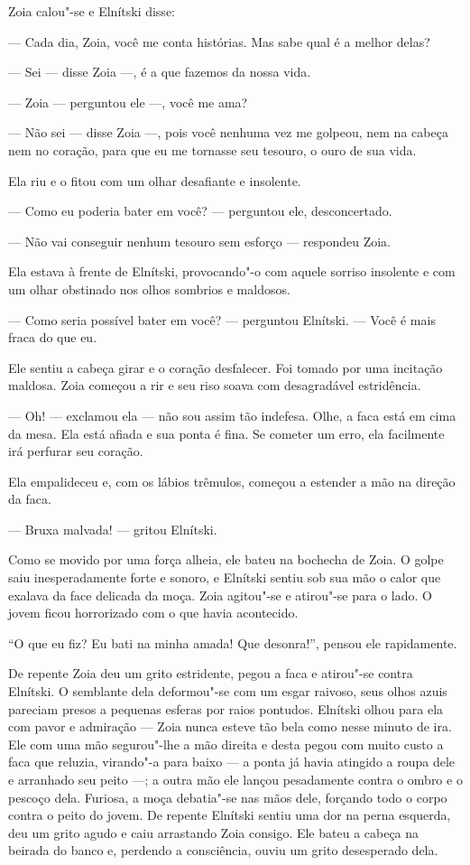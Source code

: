 Zoia calou"-se e Elnítski disse:

--- Cada dia, Zoia, você me conta histórias. Mas sabe qual é a melhor
delas?

--- Sei --- disse Zoia ---, é a que fazemos da nossa vida.

--- Zoia --- perguntou ele ---, você me ama?

--- Não sei --- disse Zoia ---, pois você nenhuma vez me golpeou, nem na
cabeça nem no coração, para que eu me tornasse seu tesouro, o ouro de
sua vida.

Ela riu e o fitou com um olhar desafiante e insolente.

--- Como eu poderia bater em você? --- perguntou ele, desconcertado.

--- Não vai conseguir nenhum tesouro sem esforço --- respondeu Zoia.

Ela estava à frente de Elnítski, provocando"-o com aquele sorriso
insolente e com um olhar obstinado nos olhos sombrios e maldosos.

--- Como seria possível bater em você? --- perguntou Elnítski. --- Você
é mais fraca do que eu.

Ele sentiu a cabeça girar e o coração desfalecer. Foi tomado por uma
incitação maldosa. Zoia começou a rir e seu riso soava com desagradável
estridência.

--- Oh! --- exclamou ela --- não sou assim tão indefesa. Olhe, a faca
está em cima da mesa. Ela está afiada e sua ponta é fina. Se cometer um
erro, ela facilmente irá perfurar seu coração.

Ela empalideceu e, com os lábios trêmulos, começou a estender a mão na
direção da faca.

--- Bruxa malvada! --- gritou Elnítski.

Como se movido por uma força alheia, ele bateu na bochecha de Zoia. O
golpe saiu inesperadamente forte e sonoro, e Elnítski sentiu sob sua mão
o calor que exalava da face delicada da moça. Zoia agitou"-se e atirou"-se
para o lado. O jovem ficou horrorizado com o que havia acontecido.

``O que eu fiz? Eu bati na minha amada! Que desonra!'', pensou ele
rapidamente.

De repente Zoia deu um grito estridente, pegou a faca e atirou"-se contra
Elnítski. O semblante dela deformou"-se com um esgar raivoso, seus olhos
azuis pareciam presos a pequenas esferas por raios pontudos. Elnítski
olhou para ela com pavor e admiração --- Zoia nunca esteve tão bela como
nesse minuto de ira. Ele com uma mão segurou"-lhe a mão direita e desta
pegou com muito custo a faca que reluzia, virando"-a para baixo --- a
ponta já havia atingido a roupa dele e arranhado seu peito ---; a outra
mão ele lançou pesadamente contra o ombro e o pescoço dela. Furiosa, a
moça debatia"-se nas mãos dele, forçando todo o corpo contra o peito do
jovem. De repente Elnítski sentiu uma dor na perna esquerda, deu um
grito agudo e caiu arrastando Zoia consigo. Ele bateu a cabeça na
beirada do banco e, perdendo a consciência, ouviu um grito desesperado
dela.

